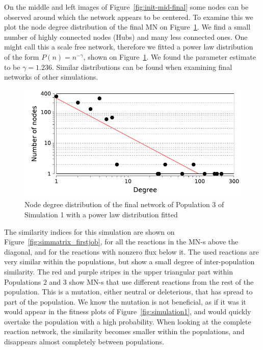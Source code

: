 \documentclass[a4paper,12pt]{article}
\begin{document}
On the middle and left images of Figure~\ref{fig:init-mid-final} some nodes can be observed around which the network appears to be centered. To examine this we plot the node degree distribution of the final MN on Figure~\ref{fig:nodedegreedistro}. We find a small number of highly connected nodes (Hubs) and many less connected ones. One might call this a scale free network, therefore we fitted a power law distribution of the form $P(n)=n^{-\gamma}$, shown on Figure~\ref{fig:nodedegreedistro}. We found the parameter estimate to be $\gamma=1.236$. Similar distributions can be found when examining final networks of other simulations. 





\begin{figure}[htpb]
	\centering
	\includegraphics[width=0.8\linewidth]{nodedegreedistro.pdf}
	\caption{Node degree distribution of the final network of Population 3 of Simulation 1 with a power law distribution fitted}
	\label{fig:nodedegreedistro}
\end{figure}

The similarity indices for this simulation are shown on Figure~\ref{fig:simmatrix_firstjob}, for all the reactions in the MN-s above the diagonal, and for the reactions with nonzero flux below it. The used reactions are very similar within the populations, but show a small degree of inter-population similarity. The red and purple stripes in the upper triangular part within Populations $2$ and $3$ show MN-s that use different reactions from the rest of the population. This is a mutation, either neutral or deleterious, that has spread to part of the population. We know the mutation is not beneficial, as if it was it would appear in the fitness plots of Figure~\ref{fig:simulation1}, and would quickly overtake the population with a high probability. When looking at the complete reaction network, the similarity becomes smaller within the populations, and disappears almost completely between populations. 
\end{document}
